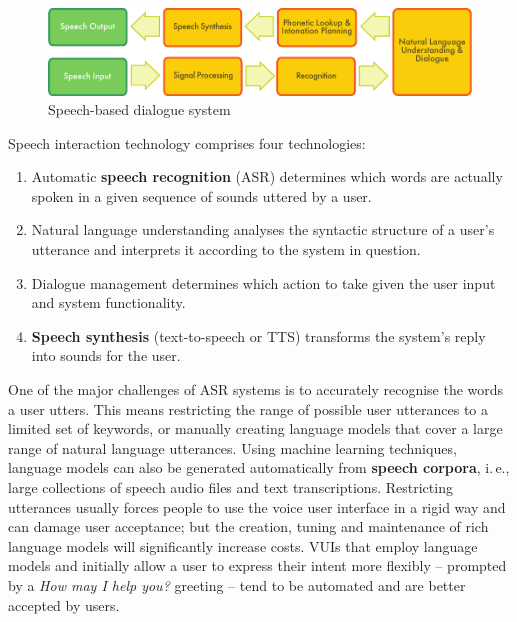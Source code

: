 \begin{multicols}{2}
\begin{figure}[htb]
  \center
  \includegraphics[width=\textwidth]{../_media/english/simple_speech-based_dialogue_architecture}
  \caption{Speech-based dialogue system}
\label{fig:dialoguearch_en}
\end{figure}

Speech interaction technology comprises four technologies: 

\begin{enumerate}
\item Automatic \textbf{speech recognition} (ASR) determines which words are actually spoken in a given sequence of sounds uttered by a user.  
\item Natural language understanding analyses the syntactic structure of a user’s utterance and interprets it according to the system in question.
\item Dialogue management determines which action to take given the user input and system functionality.   
\item \textbf{Speech synthesis} (text-to-speech or TTS) transforms the system’s reply into sounds for the user.
\end{enumerate}

One of the major challenges of ASR systems is to accurately recognise the words a user utters. This means restricting the range of possible user utterances to a limited set of keywords, or manually creating language models that cover a large range of natural language utterances. Using machine learning techniques, language models can also be generated automatically from \textbf{speech corpora}, i.\,e., large collections of speech audio files and text transcriptions. Restricting utterances usually forces people to use the voice user interface in a rigid way and can damage user acceptance; but the creation, tuning and maintenance of rich language models will significantly increase costs. VUIs that employ language models and initially allow a user to express their intent more flexibly -- prompted by a \textit{How may I help you?} greeting -- tend to be automated and are better accepted by users.


\end{multicols}
